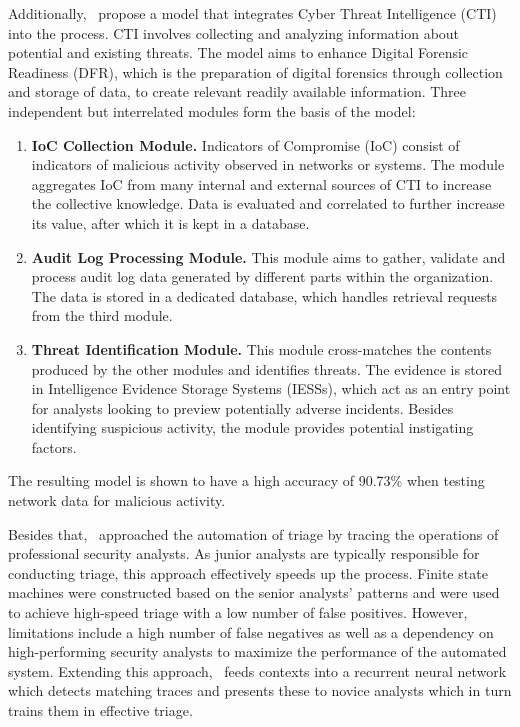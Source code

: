 Additionally,\ \citet{serketzis2019improving} propose a model that integrates Cyber Threat Intelligence (CTI) into the
process.
CTI involves collecting and analyzing information about potential and existing threats.
The model aims to enhance Digital Forensic Readiness (DFR), which is the preparation of digital forensics through
collection and storage of data, to create relevant readily available information.
Three independent but interrelated modules form the basis of the model:
\begin{enumerate}
    \item \textbf{IoC Collection Module.}
    Indicators of Compromise (IoC) consist of indicators of malicious activity observed in networks or systems.
    The module aggregates IoC from many internal and external sources of CTI to increase the collective knowledge.
    Data is evaluated and correlated to further increase its value, after which it is kept in a database.
    \item \textbf{Audit Log Processing Module.}
    This module aims to gather, validate and process audit log data generated by different parts within the
    organization.
    The data is stored in a dedicated database, which handles retrieval requests from the third module.
    \item \textbf{Threat Identification Module.}
    This module cross-matches the contents produced by the other modules and identifies threats.
    The evidence is stored in Intelligence Evidence Storage Systems (IESSs), which act as an entry point for analysts
    looking to preview potentially adverse incidents.
    Besides identifying suspicious activity, the module provides potential instigating factors.
\end{enumerate}
The resulting model is shown to have a high accuracy of 90.73\% when testing network data for malicious activity.

Besides that,\ \citet{zhong2018learning} approached the automation of triage by tracing the operations of professional
security analysts.
As junior analysts are typically responsible for conducting triage, this approach effectively speeds up the process.
Finite state machines were constructed based on the senior analysts' patterns and were used to achieve high-speed triage
with a low number of false positives.
However, limitations include a high number of false negatives as well as a dependency on high-performing security
analysts to maximize the performance of the automated system.
Extending this approach,\ \citet{lin2018data} feeds contexts into a recurrent neural network which detects matching
traces and presents these to novice analysts which in turn trains them in effective triage.


